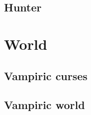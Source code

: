 \documentclass[a4paper, 12pt, finnish]{article}
\begin{document}
	\subsection{Hunter}\label{ssec:hunter}
		
\section{World}
	\subsection{Vampiric curses} \label{ssec:curses} %
		
	\subsection{Vampiric world} \label{ssec:vampire_world}
		
\end{document}
